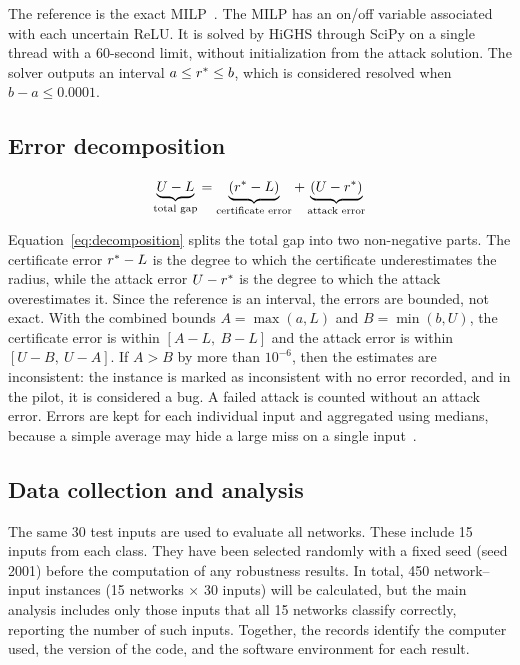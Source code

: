 The reference is the exact MILP~\cite{MapSource12}. The MILP has an on/off variable associated
with each uncertain ReLU. It is solved by HiGHS through SciPy on a single thread
with a 60-second limit, without initialization from the attack solution. The
solver outputs an interval $a \le r^{*} \le b$, which is considered resolved
when $b - a \le 0.0001$.

\subsection{Error decomposition}
\label{sec:method-decomposition}

\begin{equation}
  \underbrace{U - L}_{\text{total gap}}
  = \underbrace{(r^{*} - L)}_{\text{certificate error}}
  + \underbrace{(U - r^{*})}_{\text{attack error}}
  \label{eq:decomposition}
\end{equation}

Equation~\eqref{eq:decomposition} splits the total gap into two non-negative parts.
The certificate error $r^{*} - L$ is the degree to which the certificate underestimates the
radius, while the attack error $U - r^{*}$ is the degree to which the attack overestimates it.
Since the reference is an interval, the errors are bounded, not
exact. With the combined bounds $A = \max(a, L)$ and
$B = \min(b, U)$, the certificate error is within $[A - L,\ B - L]$ and the attack error is within
$[U - B,\ U - A]$. If $A > B$ by more than $10^{-6}$, then the estimates are inconsistent: the
instance is marked as inconsistent with no error recorded, and in the pilot, it is
considered a bug. A failed attack is counted without an attack error. Errors are
kept for each individual input and aggregated using medians, because a simple average may hide a
large miss on a single input~\cite{Carlini2017Provable}.

\subsection{Data collection and analysis}
\label{sec:method-collection}

The same 30 test inputs are used to evaluate all networks. These include 15
inputs from each class. They have been selected randomly with a fixed seed (seed
2001) before the computation of any robustness results. In total, 450 network--input instances (15
networks $\times$ 30 inputs) will be calculated, but the main analysis includes
only those inputs that all 15 networks classify correctly, reporting the number of
such inputs. Together, the records identify the computer used, the version of the
code, and the software environment for each result.

